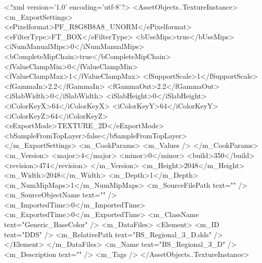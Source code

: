 <?xml version='1.0' encoding='utf-8'?>
<AssetObjects..TextureInstance>
  <m_ExportSettings>
    <ePixelformat>PF_R8G8B8A8_UNORM</ePixelformat>
    <eFilterType>FT_BOX</eFilterType>
    <bUseMips>true</bUseMips>
    <iNumManualMips>0</iNumManualMips>
    <bCompleteMipChain>true</bCompleteMipChain>
    <fValueClampMin>0</fValueClampMin>
    <fValueClampMax>1</fValueClampMax>
    <fSupportScale>1</fSupportScale>
    <fGammaIn>2.2</fGammaIn>
    <fGammaOut>2.2</fGammaOut>
    <iSlabWidth>0</iSlabWidth>
    <iSlabHeight>0</iSlabHeight>
    <iColorKeyX>64</iColorKeyX>
    <iColorKeyY>64</iColorKeyY>
    <iColorKeyZ>64</iColorKeyZ>
    <eExportMode>TEXTURE_2D</eExportMode>
    <bSampleFromTopLayer>false</bSampleFromTopLayer>
  </m_ExportSettings>
  <m_CookParams>
    <m_Values />
  </m_CookParams>
  <m_Version>
    <major>4</major>
    <minor>0</minor>
    <build>350</build>
    <revision>474</revision>
  </m_Version>
  <m_Height>2048</m_Height>
  <m_Width>2048</m_Width>
  <m_Depth>1</m_Depth>
  <m_NumMipMaps>1</m_NumMipMaps>
  <m_SourceFilePath text="" />
  <m_SourceObjectName text="" />
  <m_ImportedTime>0</m_ImportedTime>
  <m_ExportedTime>0</m_ExportedTime>
  <m_ClassName text="Generic_BaseColor" />
  <m_DataFiles>
    <Element>
      <m_ID text="DDS" />
      <m_RelativePath text="BS_Regional_3_D.dds" />
    </Element>
  </m_DataFiles>
  <m_Name text="BS_Regional_3_D" />
  <m_Description text="" />
  <m_Tags />
</AssetObjects..TextureInstance>